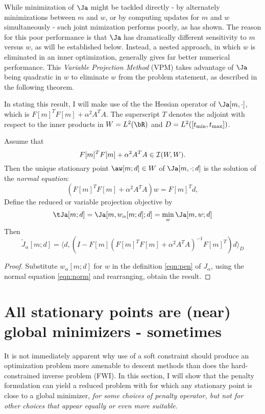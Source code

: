 While minimization of $\Ja$ might be tackled directly - by
alternately minimizations between $m$ and $w$, or by computing updates
for $m$ and $w$ simultaneously - such joint mimization performs
poorly, as \cite{YinHuang:16} has shown. The reason for this poor
performance is that $\Ja$ has dramatically different
sensitivity to $m$ versus $w$,
as will be established below.
Instead, a nested approach, in which $w$ is
eliminated in an inner optimization,
generally gives far better numerical performance.  This {\em Variable
Projection Method} (VPM) \cite[]{GolubPereyra:03} takes advantage of
$\Ja$ being quadratic in
$w$ to eliminate $w$ from the problem statement, as described in the
following theorem.

In stating this result, I will make use of the the Hessian operator of
$\Ja[m,\cdot]$, which is $F[m]^TF[m] + \alpha^2 A^TA$. The
superscript $T$ denotes the adjoint with respect to the inner products
in $W=L^2(\bR)$ and $D=L^2([t_{\rm min},t_{\rm max}])$.

\begin{theorem}
\label{thm:red}
Assume that
\begin{equation}
\label{eqn:norminv}
F[m]^TF[m] +\alpha^2 A^TA \in {\cal I}(W,W).
\end{equation}
Then the unique stationary point $\aw[m;d] \in W$ of
$\Ja[m,\cdot;d]$ is the solution of the {\em normal equation}:
\begin{equation}
  \label{eqn:norm}
  (F[m]^TF[m]+\alpha^2A^TA)w= F[m]^Td,
\end{equation}
Define the reduced or variable projection objective by
\begin{equation}
  \label{eqn:redexp}
  \tJa[m;d] =\Ja[m,w_{\alpha}[m;d];d] = \min_w \Ja[m,w;d]
\end{equation}
Then
\begin{equation}
  \label{eqn:objexp}
  \tilde{J}_{\alpha}[m;d] =\langle d, (I-F[m]
  (F[m]^TF[m]+\alpha^2A^TA)^{-1}F[m]^T)d\rangle_D
\end{equation}
\end{theorem}

\begin{proof}
Substitute $w_{\alpha}[m;d]$ for $w$ in the definition \ref{eqn:pen}
of $J_{\alpha}$, using the normal equation \ref{eqn:norm} and 
rearranging, obtain the result.
\end{proof}

\section{All stationary points are (near) global minimizers -
  sometimes}
It is not immediately apparent why use of a soft constraint should
produce an optimization problem more amenable to descent methods than
does the hard-constrained inverse problem (FWI). In this section, I
will show that the penalty formulation can yield a reduced problem
with for which any stationary point is close to a global minimizer,
{\em for some choices of penalty operator, but not for other choices
  that appear equally or even more suitable}. 

